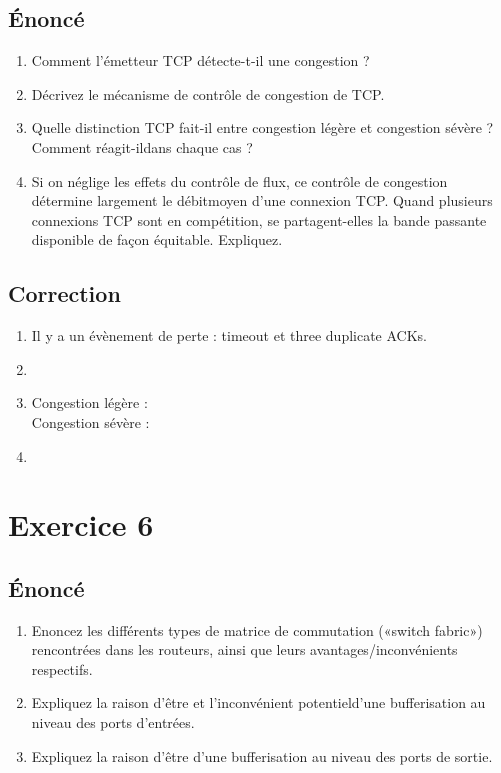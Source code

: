 \documentclass[a4paper, 11pt, titlepage]{article}
\begin{document}
\subsection{\'Enoncé}
\begin{enumerate}[label=(\alph*)]
  \item Comment l’émetteur TCP détecte-t-il une congestion ?
  \item Décrivez le mécanisme de contrôle de congestion de TCP.
  \item Quelle distinction TCP fait-il entre congestion légère et congestion sévère ? Comment réagit-ildans chaque cas ? 
  \item Si on néglige les effets du contrôle de flux, ce contrôle de congestion détermine largement le débitmoyen d’une connexion TCP. Quand plusieurs connexions TCP sont en compétition, se partagent-elles la bande passante disponible de façon équitable. Expliquez.
\end{enumerate}

\subsection{Correction}
\begin{enumerate}[label=(\alph*)]
\item 
Il y a un évènement de perte : timeout et three duplicate ACKs.

\item

\item 
Congestion légère : \\

Congestion sévère : \\

\item 

\end{enumerate}

\section{Exercice 6}
\subsection{\'Enoncé}
\begin{enumerate}[label=(\alph*)]
  \item Enoncez les différents types de matrice de commutation («switch fabric») rencontrées dans les routeurs, ainsi que leurs avantages/inconvénients respectifs.
  \item Expliquez la raison d’être et l’inconvénient potentield’une bufferisation au niveau des ports d’entrées.
  \item Expliquez la raison d’être d’une bufferisation au niveau des ports de sortie.
\end{enumerate}
\end{document}
